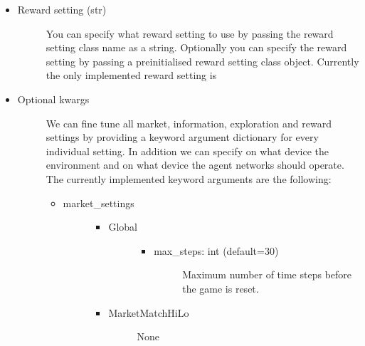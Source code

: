 \documentclass[letterpaper,10pt,english]{sphinxmanual}
\begin{document}
\begin{itemize}
\begin{description}
\end{description}

\item {} \begin{description}
\item[{Reward setting (str)}] \leavevmode
\sphinxAtStartPar
You can specify what reward setting to use by passing the reward setting class name as a string. Optionally you can
specify the reward setting by passing a pre\sphinxhyphen{}initialised reward setting class object. Currently the only implemented
reward setting is 

\end{description}

\item {} \begin{description}
\item[{Optional kwargs}] \leavevmode
\sphinxAtStartPar
We can fine tune all market, information, exploration and reward settings by providing a keyword argument dictionary
for every individual setting. In addition we can specify on what device the environment and on what device the
agent networks should operate. The currently implemented keyword arguments are the following:
\begin{itemize}
\item {} \begin{description}
\item[{market\_settings}] \leavevmode\begin{itemize}
\item {} \begin{description}
\item[{Global}] \leavevmode\begin{itemize}
\item {} \begin{description}
\item[{max\_steps: int (default=30)}] \leavevmode
\sphinxAtStartPar
Maximum number of time steps before the game is reset.

\end{description}

\end{itemize}

\end{description}

\item {} \begin{description}
\item[{MarketMatchHiLo}] \leavevmode
\sphinxAtStartPar
None


\end{description}
\end{itemize}
\end{description}
\end{itemize}
\end{description}
\end{itemize}
\end{document}
